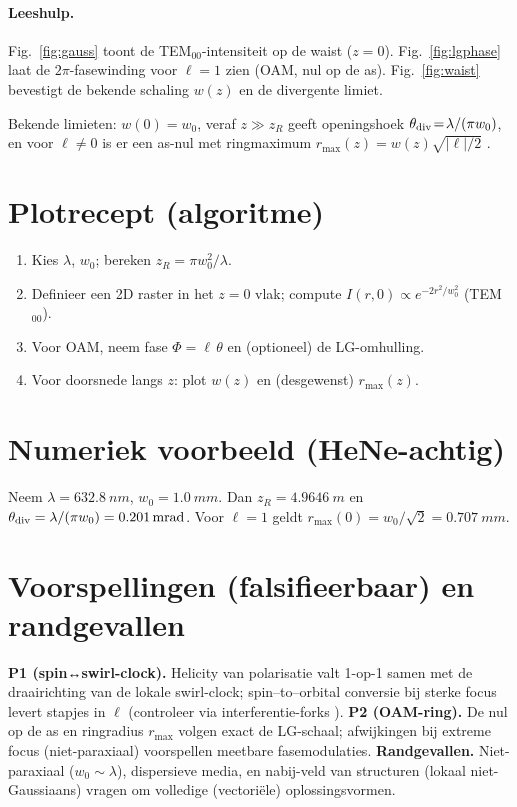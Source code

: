 \documentclass[aps,prb,preprint,amsmath,amssymb]{revtex4-2} %
\begin{document}
    \paragraph{Leeshulp.}
        Fig.~\ref{fig:gauss} toont de TEM$_{00}$-intensiteit op de waist ($z=0$).
        Fig.~\ref{fig:lgphase} laat de $2\pi$-fasewinding voor $\ell=1$ zien (OAM, nul op de as).
        Fig.~\ref{fig:waist} bevestigt de bekende schaling $w(z)$ en de divergente limiet.

        Bekende limieten: $w(0)=w_0$, veraf $z\gg z_R$ geeft openingshoek $\theta_{\rm div}\!=\!\lambda/(\pi w_0)$,
        en voor $\ell\neq 0$ is er een as-nul met ringmaximum $r_{\max}(z)=w(z)\sqrt{|\ell|/2}$ \cite{Allen1992,Berry2001}.

    \section{Plotrecept (algoritme)}
    \begin{enumerate}
        \item Kies \(\lambda\), \(w_0\); bereken \(z_R=\pi w_0^2/\lambda\).
        \item Definieer een 2D raster in het $z=0$ vlak; compute \(I(r,0)\propto e^{-2r^2/w_0^2}\) (TEM$_{00}$).
        \item Voor OAM, neem fase \(\Phi=\ell\,\theta\) en (optioneel) de LG-omhulling.
        \item Voor doorsnede langs $z$: plot \(w(z)\) en (desgewenst) \(r_{\max}(z)\).
    \end{enumerate}

    \section{Numeriek voorbeeld (HeNe-achtig)}
    Neem \(\lambda=\SI{632.8}{nm}\), \(w_0=\SI{1.0}{mm}\).
    Dan \(z_R=\SI{4.9646}{m}\) en \(\theta_{\rm div}=\lambda/(\pi w_0)=\SI{0.201}{mrad}\).
    Voor \(\ell=1\) geldt \(r_{\max}(0)=w_0/\sqrt{2}=\SI{0.707}{mm}\).

    \section{Voorspellingen (falsifieerbaar) en randgevallen}
    \textbf{P1 (spin↔swirl-clock).} Helicity van polarisatie valt 1-op-1 samen met de draairichting van de lokale swirl-clock;
    spin–to–orbital conversie bij sterke focus levert stapjes in $\ell$ (controleer via interferentie-forks \cite{Berry2001}).
    \textbf{P2 (OAM-ring).} De nul op de as en ringradius \(r_{\max}\) volgen exact de LG-schaal;
    afwijkingen bij extreme focus (niet-paraxiaal) voorspellen meetbare fasemodulaties.
    \textbf{Randgevallen.} Niet-paraxiaal (\(w_0\!\sim\!\lambda\)), dispersieve media, en nabij-veld van structuren
    (lokaal niet-Gaussiaans) vragen om volledige (vectoriële) oplossingsvormen.
\end{document}
